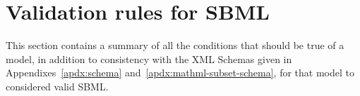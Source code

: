 
\newcommand{\sbmlrule}[1]{\item[#1.]}

\section{Validation rules for SBML}
\label{apdx:validation-rules}

This section contains a summary of all the conditions that should
be true of a model, in addition to consistency with the XML
Schemas given in Appendixes~\ref{apdx:schema}
and~\ref{apdx:mathml-subset-schema}, for that model to considered
valid SBML.


